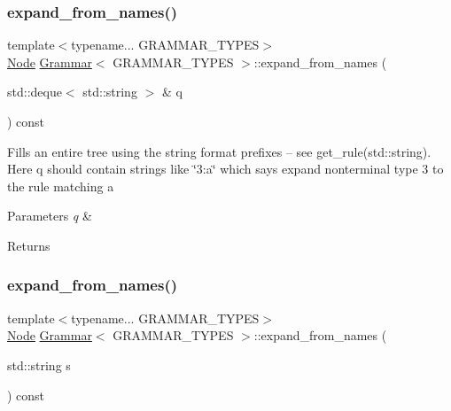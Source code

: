 \mbox{\label{class_grammar_aef582b15696b97c3376cba935a76acef}} 
\subsubsection{\texorpdfstring{expand\+\_\+from\+\_\+names()}{expand\_from\_names()}\hspace{0.1cm}{\footnotesize\ttfamily [1/3]}}
{\footnotesize\ttfamily template$<$typename... G\+R\+A\+M\+M\+A\+R\+\_\+\+T\+Y\+P\+ES$>$ \\
\hyperlink{class_node}{Node} \hyperlink{class_grammar}{Grammar}$<$ G\+R\+A\+M\+M\+A\+R\+\_\+\+T\+Y\+P\+ES $>$\+::expand\+\_\+from\+\_\+names (\begin{DoxyParamCaption}\item[{std\+::deque$<$ std\+::string $>$ \&}]{q }\end{DoxyParamCaption}) const\hspace{0.3cm}{\ttfamily [inline]}}

Fills an entire tree using the string format prefixes -- see get\+\_\+rule(std\+::string). Here q should contain strings like \char`\"{}3\+:\textquotesingle{}a\textquotesingle{}\char`\"{} which says expand nonterminal type 3 to the rule matching \textquotesingle{}a\textquotesingle{} 
\begin{DoxyParams}{Parameters}
{\em q} & \\
\hline
\end{DoxyParams}
\begin{DoxyReturn}{Returns}

\end{DoxyReturn}
\mbox{\label{class_grammar_a53a651b1fb2cad39efc4717b635b922e}} 
\subsubsection{\texorpdfstring{expand\+\_\+from\+\_\+names()}{expand\_from\_names()}\hspace{0.1cm}{\footnotesize\ttfamily [2/3]}}
{\footnotesize\ttfamily template$<$typename... G\+R\+A\+M\+M\+A\+R\+\_\+\+T\+Y\+P\+ES$>$ \\
\hyperlink{class_node}{Node} \hyperlink{class_grammar}{Grammar}$<$ G\+R\+A\+M\+M\+A\+R\+\_\+\+T\+Y\+P\+ES $>$\+::expand\+\_\+from\+\_\+names (\begin{DoxyParamCaption}\item[{std\+::string}]{s }\end{DoxyParamCaption}) const\hspace{0.3cm}{\ttfamily [inline]}}

